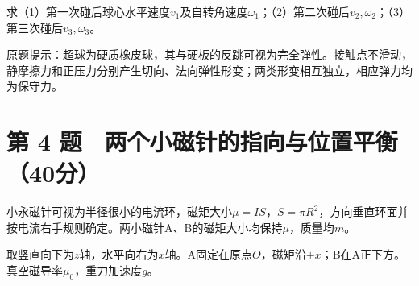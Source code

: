\documentclass[12pt,a4paper,fontset=fandol]{ctexart}
\begin{document}
\begin{center}
\begin{minipage}{\linewidth}
\centering\begingroup{}
\ifdim\wd\diagrambox>.88\linewidth
\sbox{\diagrambox}{\resizebox{.88\linewidth}{!}{\usebox{\diagrambox}}}\fi
\ifdim\ht\diagrambox>.20\textheight
\resizebox{!}{.20\textheight}{\usebox{\diagrambox}}
\else\usebox{\diagrambox}\fi
\par{}\endgroup\end{minipage}\end{center}

求（1）第一次碰后球心水平速度\(v_1\)及自转角速度\(\omega_1\)；（2）第二次碰后\(v_2,\omega_2\)；（3）第三次碰后\(v_3,\omega_3\)。

原题提示：超球为硬质橡皮球，其与硬板的反跳可视为完全弹性。接触点不滑动，静摩擦力和正压力分别产生切向、法向弹性形变；两类形变相互独立，相应弹力均为保守力。

\clearpage

\section{第 4
题　两个小磁针的指向与位置平衡（40分）}\label{ux7b2c-4-ux9898-ux4e24ux4e2aux5c0fux78c1ux9488ux7684ux6307ux5411ux4e0eux4f4dux7f6eux5e73ux886140ux5206}

小永磁针可视为半径很小的电流环，磁矩大小\(\mu=IS\)，\(S=\pi R^2\)，方向垂直环面并按电流右手规则确定。两小磁针A、B的磁矩大小均保持\(\mu\)，质量均\(m\)。

取竖直向下为\(z\)轴，水平向右为\(x\)轴。A固定在原点\(O\)，磁矩沿\(+x\)；B在A正下方。真空磁导率\(\mu_0\)，重力加速度\(g\)。
\end{document}
